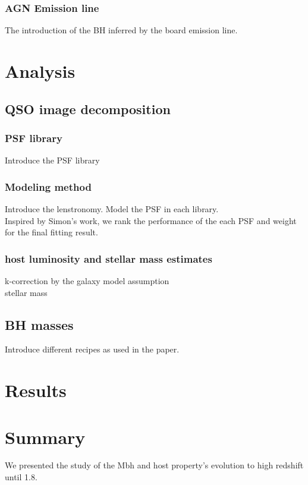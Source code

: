 \documentclass[apj]{emulateapj}
\begin{document}
\subsubsection{AGN Emission line}
\label{sec:bh_mass}
The introduction of the BH inferred by the board emission line.

\section{Analysis}
\label{sec:Analysis}

\subsection{QSO image decomposition}
\subsubsection{PSF library}	
\label{sec:psf_library}
Introduce the PSF library

\subsubsection{Modeling method}
Introduce the lenstronomy. Model the PSF in each library.\\
Inspired by Simon's work, we rank the performance of the each PSF and weight for the final fitting result. 

\subsubsection{host luminosity and stellar mass estimates}
k-correction by the galaxy model assumption\\
stellar mass \\

\subsection{BH masses}
Introduce different recipes as used in the paper.

\section{Results}
\label{sec:result}


\section{Summary}
\label{sec:sum}
We presented the study of the Mbh and host property's evolution to high redshift until 1.8.
\end{document}
